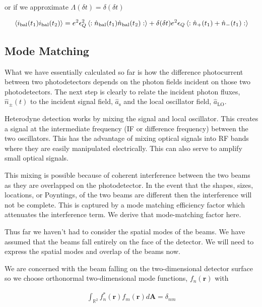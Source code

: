 \documentclass[12pt]{article}
\newcommand{\ep}{\epsilon}
\newcommand{\bv}[1]{\boldsymbol{#1}}
\begin{document}
or if we approximate $\Lambda(\delta t) = \delta(\delta t)$

\begin{align}
\label{balcurrent}
\Braket{i_{\text{bal}}(t_1)i_{\text{bal}}(t_2)} = e^2\ep_Q^2 \Braket{:\hat{n}_{\text{bal}}(t_1) \hat{n}_{\text{bal}}(t_2) :} + \delta(\delta t)e^2\ep_Q \Braket{: \hat{n}_+(t_1) + \hat{n}_-(t_1):}\\
\end{align}

\subsection{Mode Matching}

What we have essentially calculated so far is how the difference photocurrent between two photodetectors depends on the photon fields incident on those two photodetectors. The next step is clearly to relate the incident photon fluxes, $\hat{n}_{\pm}(t)$ to the incident signal field, $\hat{a}_{\text{s}}$ and the local oscillator field, $\hat{a}_{\text{LO}}$.

Heterodyne detection works by mixing the signal and local oscillator. This creates a signal at the intermediate frequency (IF or difference frequency) between the two oscillators. This has the advantage of mixing optical signals into RF bands where they are easily manipulated electrically. This can also serve to amplify small optical signals.

This mixing is possible because of coherent interference between the two beams as they are overlapped on the photodetector. In the event that the shapes, sizes, locations, or Poyntings, of the two beams are different then the interference will not be complete. This is captured by a mode matching efficiency factor which attenuates the interference term. We derive that mode-matching factor here.

Thus far we haven't had to consider the spatial modes of the beams. We have assumed that the beams fall entirely on the face of the detector. We will need to express the spatial modes and overlap of the beams now.

We are concerned with the beam falling on the two-dimensional detector surface so we choose orthonormal two-dimensional mode functions, $f_n(\bv{r})$ with

\begin{align}
\int_{\mathbb{R}^2} f_n^*(\bv{r}) f_m(\bv{r})d\bv{A} = \delta_{nm}
\end{align}
\end{document}
